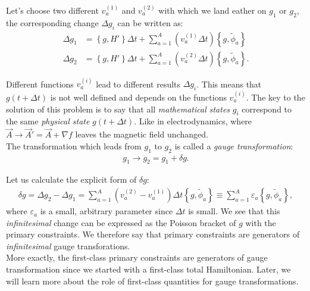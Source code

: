 Let's choose two different $v_a^{(1)}$ and $v_a^{(2)}$ with which we land eather on $g_1$ or $g_2$, the corresponding change $\Delta g_i$ can be written as:
\begin{align}
\Delta g_1 &= \left \{ g,H' \right \} \Delta t + \sum_{a=1}^A \left( v_a^{(1)} \Delta t \right) \left \{ g,\tilde{\phi}_a \right \} \\
\Delta g_2 &= \left \{ g,H' \right \} \Delta t + \sum_{a=1}^A \left( v_a^{(2)} \Delta t \right) \left \{ g,\tilde{\phi}_a \right \}.
\end{align}

Different functions $v_a^{(i)}$ lead to different results $\Delta g_i$. This means that $g(t + \Delta t)$ is not well defined and depends on the functions $v_a^{(i)}$. The key to the solution of this problem is to say that all \textit{mathematical states} $g_i$ correspond to the same \textit{physical state} $g(t + \Delta t)$. Like in electrodynamics, where $\vec{A} \longrightarrow \vec{A}' = \vec{A} + \nabla f$ leaves the magnetic field unchanged. \\

The transformation which leads from $g_1$ to $g_2$ is called a \textit{gauge transformation}:
\begin{align}
g_1 \longrightarrow g_2 =  g_1 + \delta g.
\end{align}

Let us calculate the explicit form of $\delta g$:
\begin{align}
\delta g = \Delta g_2 - \Delta g_1 = \sum_{a=1}^A \left( v_a^{(2)} - v_a^{(1)} \right) \Delta t \left \{ g,\tilde{\phi}_a \right \} \equiv \sum_{a=1}^A \varepsilon_a \left \{ g,\tilde{\phi}_a \right \},
\end{align}
where $\varepsilon_a$ is a small, arbitrary parameter since $\Delta t$ is small.
\label{sec:gauge_transformations}
We see that this \textit{infinitesimal} change can be expressed as the Poisson bracket of $g$ with the primary constraints. We therefore say that primary constraints are generators of \textit{infinitesimal} gauge transforations. \\
More exactly, the first-class primary constraints are generators of gauge transformation since we started with a first-class total Hamiltonian. Later, we will learn more about the role of first-class quantities for gauge transformations. \\

